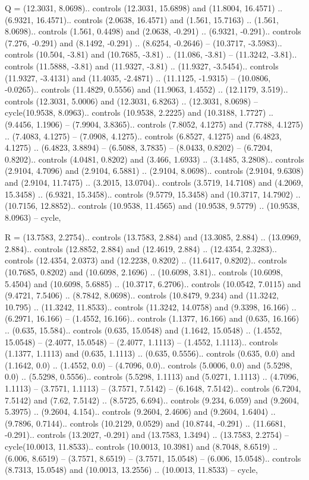 Q = {(12.3031, 8.0698).. controls (12.3031, 15.6898) and (11.8004, 16.4571) .. (6.9321, 16.4571).. controls (2.0638, 16.4571) and (1.561, 15.7163) .. (1.561, 8.0698).. controls (1.561, 0.4498) and (2.0638, -0.291) .. (6.9321, -0.291).. controls (7.276, -0.291) and (8.1492, -0.291) .. (8.6254, -0.2646) -- (10.3717, -3.5983).. controls (10.504, -3.81) and (10.7685, -3.81) .. (11.086, -3.81) -- (11.3242, -3.81).. controls (11.5888, -3.81) and (11.9327, -3.81) .. (11.9327, -3.5454).. controls (11.9327, -3.4131) and (11.4035, -2.4871) .. (11.1125, -1.9315) -- (10.0806, -0.0265).. controls (11.4829, 0.5556) and (11.9063, 1.4552) .. (12.1179, 3.519).. controls (12.3031, 5.0006) and (12.3031, 6.8263) .. (12.3031, 8.0698) -- cycle(10.9538, 8.0963).. controls (10.9538, 2.2225) and (10.3188, 1.7727) .. (9.4456, 1.1906) -- (7.9904, 3.8365).. controls (7.8052, 4.1275) and (7.7788, 4.1275) .. (7.4083, 4.1275) -- (7.0908, 4.1275).. controls (6.8527, 4.1275) and (6.4823, 4.1275) .. (6.4823, 3.8894) -- (6.5088, 3.7835) -- (8.0433, 0.8202) -- (6.7204, 0.8202).. controls (4.0481, 0.8202) and (3.466, 1.6933) .. (3.1485, 3.2808).. controls (2.9104, 4.7096) and (2.9104, 6.5881) .. (2.9104, 8.0698).. controls (2.9104, 9.6308) and (2.9104, 11.7475) .. (3.2015, 13.0704).. controls (3.5719, 14.7108) and (4.2069, 15.3458) .. (6.9321, 15.3458).. controls (9.5779, 15.3458) and (10.3717, 14.7902) .. (10.7156, 12.8852).. controls (10.9538, 11.4565) and (10.9538, 9.5779) .. (10.9538, 8.0963) -- cycle},

R = {(13.7583, 2.2754).. controls (13.7583, 2.884) and (13.3085, 2.884) .. (13.0969, 2.884).. controls (12.8852, 2.884) and (12.4619, 2.884) .. (12.4354, 2.3283).. controls (12.4354, 2.0373) and (12.2238, 0.8202) .. (11.6417, 0.8202).. controls (10.7685, 0.8202) and (10.6098, 2.1696) .. (10.6098, 3.81).. controls (10.6098, 5.4504) and (10.6098, 5.6885) .. (10.3717, 6.2706).. controls (10.0542, 7.0115) and (9.4721, 7.5406) .. (8.7842, 8.0698).. controls (10.8479, 9.234) and (11.3242, 10.795) .. (11.3242, 11.8533).. controls (11.3242, 14.0758) and (9.3398, 16.166) .. (6.2971, 16.166) -- (1.4552, 16.166).. controls (1.1377, 16.166) and (0.635, 16.166) .. (0.635, 15.584).. controls (0.635, 15.0548) and (1.1642, 15.0548) .. (1.4552, 15.0548) -- (2.4077, 15.0548) -- (2.4077, 1.1113) -- (1.4552, 1.1113).. controls (1.1377, 1.1113) and (0.635, 1.1113) .. (0.635, 0.5556).. controls (0.635, 0.0) and (1.1642, 0.0) .. (1.4552, 0.0) -- (4.7096, 0.0).. controls (5.0006, 0.0) and (5.5298, 0.0) .. (5.5298, 0.5556).. controls (5.5298, 1.1113) and (5.0271, 1.1113) .. (4.7096, 1.1113) -- (3.7571, 1.1113) -- (3.7571, 7.5142) -- (6.1648, 7.5142).. controls (6.7204, 7.5142) and (7.62, 7.5142) .. (8.5725, 6.694).. controls (9.234, 6.059) and (9.2604, 5.3975) .. (9.2604, 4.154).. controls (9.2604, 2.4606) and (9.2604, 1.6404) .. (9.7896, 0.7144).. controls (10.2129, 0.0529) and (10.8744, -0.291) .. (11.6681, -0.291).. controls (13.2027, -0.291) and (13.7583, 1.3494) .. (13.7583, 2.2754) -- cycle(10.0013, 11.8533).. controls (10.0013, 10.3981) and (8.7048, 8.6519) .. (6.006, 8.6519) -- (3.7571, 8.6519) -- (3.7571, 15.0548) -- (6.006, 15.0548).. controls (8.7313, 15.0548) and (10.0013, 13.2556) .. (10.0013, 11.8533) -- cycle},

